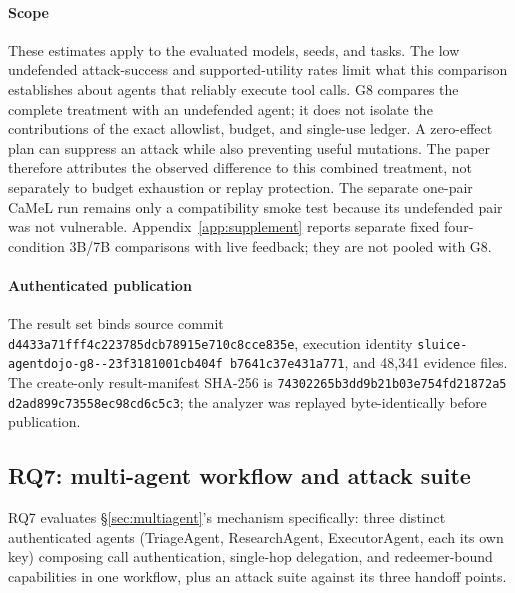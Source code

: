 \documentclass[conference,compsoc]{IEEEtran}
\newcommand{\GviiiExecutionID}{\texttt{sluice-agentdojo-g8-\allowbreak
20260828-\allowbreak 23f31810\allowbreak 01cb404f\allowbreak
b7641c37\allowbreak e431a771}}
\newcommand{\GviiiManifestSHA}{\texttt{74302265\allowbreak b3dd9b21\allowbreak
68652630\allowbreak b03e754f\allowbreak d21872a5\allowbreak
d2ad899c\allowbreak 73558ec9\allowbreak 8cd6c5c3}}
\begin{document}
\paragraph{Scope}

These estimates apply to the evaluated models, seeds, and tasks. The low undefended attack-success and supported-utility rates limit what this comparison establishes about agents that reliably execute tool calls. G8 compares the complete treatment with an undefended agent; it does not isolate the contributions of the exact allowlist, budget, and single-use ledger. A zero-effect plan can suppress an attack while also preventing useful mutations. The paper therefore attributes the observed difference to this combined treatment, not separately to budget exhaustion or replay protection. The separate one-pair CaMeL run remains only a compatibility smoke test because its undefended pair was not vulnerable. Appendix~\ref{app:supplement} reports separate fixed four-condition 3B/7B comparisons with live feedback; they are not pooled with G8.

\paragraph{Authenticated publication}
The result set binds source commit
\nolinkurl{d4433a71fff4c223785dcb78915e710c8cce835e}, execution identity
\GviiiExecutionID{},
and 48{,}341 evidence files. The create-only result-manifest SHA-256 is
\GviiiManifestSHA{};
the analyzer was replayed byte-identically before publication.

\subsection{RQ7: multi-agent workflow and attack suite}
RQ7 evaluates \S\ref{sec:multiagent}'s mechanism specifically: three distinct
authenticated agents (TriageAgent, ResearchAgent, ExecutorAgent, each its
own key) composing call authentication, single-hop delegation, and
redeemer-bound capabilities in one workflow, plus an attack suite against
its three handoff points.
\end{document}
